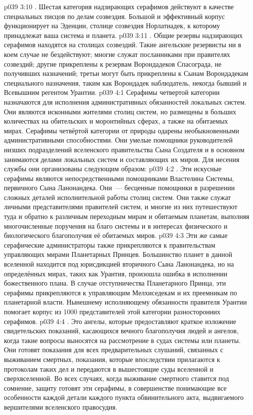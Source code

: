 \vs p039 3:10 . Шестая категория надзирающих серафимов действуют в качестве специальных писцов по делам созвездия. Большой и эффективный корпус функционирует на Эденции, столице созвездия Норлатиадек, к которому принадлежат ваша система и планета.
\vs p039 3:11 . Общие резервы надзирающих серафимов находятся на столицах созвездий. Такие ангельские резервисты ни в коем случае не бездействуют; многие служат посланниками при правителях созвездий; другие прикреплены к резервам Ворондадеков Спасограда, не получивших назначений; третьи могут быть прикреплены к Сынам Ворондадекам специального назначения, таким как Ворондадек наблюдатель, некогда бывший и Всевышним регентом Урантии.
\vs p039 4:1 Серафимы четвертой категории назначаются для исполнения административных обязанностей локальных систем. Они являются исконными жителями столиц систем, но размещены в больших количествах на обительских и моронтийных сферах, а также на обитаемых мирах. Серафимы четвёртой категории от природы одарены необыкновенными административными способностями. Они умелые помощники руководителей низших подразделений вселенского правительства Сына Создателя и в основном занимаются делами локальных систем и составляющих их миров. Для несения службы они организованы следующим образом:
\vs p039 4:2 . Эти искусные серафимы являются непосредственными помощниками Властелина Системы, первичного Сына Ланонандека. Они~--- бесценные помощники в разрешении сложных деталей исполнительной работы столиц систем. Они также служат личными представителями правителей систем, и многие из них путешествуют туда и обратно к различным переходным мирам и обитаемым планетам, выполняя многочисленные поручения на благо системы и в интересах физического и биологического благополучия её обитаемых миров.
\vs p039 4:3 Эти же самые серафические администраторы также прикрепляются к правительствам управляющих мирами Планетарных Принцев. Большинство планет в данной вселенной находится под юрисдикцией вторичного Сына Ланонандека, но на определённых мирах, таких как Урантия, произошла ошибка в исполнении божественного плана. В случае отступничества Планетарного Принца, эти серафимы прикрепляются к управляющим Мелхиседекам и их преемникам по планетарной власти. Нынешнему исполняющему обязанности правителя Урантии помогает корпус из 1000 представителей этой категории разносторонних серафимов.
\vs p039 4:4 . Это ангелы, которые предоставляют краткое изложение свидетельских показаний, касающихся вечного благополучия людей и ангелов, когда такие вопросы выносятся на рассмотрение в судах системы или планеты. Они готовят показания для всех предварительных слушаний, связанных с выживанием смертных, показания, которые впоследствии прилагаются к протоколам таких дел и передаются в вышестоящие суды вселенной и сверхвселенной. Во всех случаях, когда выживание смертного ставится под сомнение, защиту готовят эти серафимы, в совершенстве понимающие все особенности каждой детали каждого пункта обвинительного акта, выдвигаемого вершителями вселенского правосудия.
